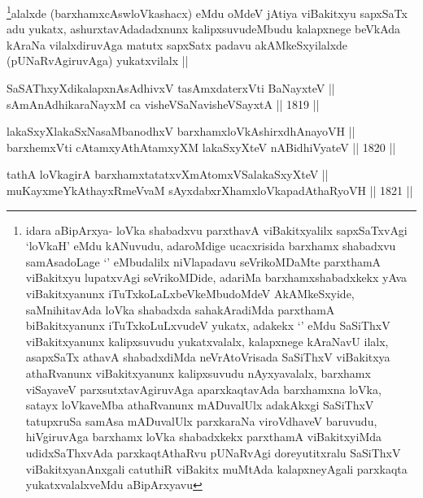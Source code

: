 \begin{artha}
\footnote[1]{idara aBipArxya- loVka shabadxvu parxthavA
viBakitxyalilx sapxSaTxvAgi `loVkaH' eMdu kANuvudu, adaroMdige
ucacxrisida barxhamx shabadxvu samAsadoLage `\stext' eMbudalilx
niVlapadavu seVrikoMDaMte parxthamA viBakitxyu lupatxvAgi
seVrikoMDide, adariMa barxhamxshabadxkekx yAva viBakitxyanunx
iTuTxkoLaLxbeVkeMbudoMdeV AkAMkeSxyide, saMnihitavAda loVka
shabadxda sahakAradiMda parxthamA biBakitxyanunx iTuTxkoLuLxvudeV
yukatx, adakekx `\stext' eMdu SaSiThxV viBakitxyanunx kalipxsuvudu
yukatxvalalx, kalapxnege kAraNavU ilalx, asapxSaTx athavA
shabadxdiMda neVrAtoVrisada SaSiThxV viBakitxya athaRvanunx
viBakitxyanunx kalipxsuvudu nAyxyavalalx, barxhamx viSayaveV
parxsutxtavAgiruvAga aparxkaqtavAda barxhamxna loVka, satayx
loVkaveMba athaRvanunx mADuvalUlx adakAkxgi SaSiThxV tatupxruSa
samAsa mADuvalUlx parxkaraNa viroVdhaveV baruvudu, hiVgiruvAga
barxhamx loVka shabadxkekx parxthamA viBakitxyiMda udidxSaThxvAda
parxkaqtAthaRvu pUNaRvAgi doreyutitxralu SaSiThxV viBakitxyanAnxgali
catuthiR viBakitx muMtAda kalapxneyAgali parxkaqta yukatxvalalxveMdu aBipArxyavu}alalxde (barxhamxcAswloVkashacx) eMdu oMdeV jAtiya
viBakitxyu sapxSaTx adu yukatx, ashurxtavAdadadxnunx kalipxsuvudeMbudu
kalapxnege beVkAda kAraNa vilalxdiruvAga matutx sapxSatx padavu
akAMkeSxyilalxde (pUNaRvAgiruvAga) yukatxvilalx ||
\end{artha}

\begin{shl}
SaSAThxyXdikalapxnA\s sAdhivxV tasAmxdaterxVti BaNayxteV || \\
sAmAnAdhikaraNayxM ca visheVSaNavisheVSayxtA ||  1819 ||  
\end{shl}

\begin{shl}
lakaSxyXlakaSxNasaMbanodhxV barxhamxloVkAshirxdhAnayoVH || \\
barxhemxVti cA\s \s tamxyAthAtamxyXM lakaSxyXteV nABidhiVyateV ||  1820 || 
\end{shl}

\begin{shl}
tathA loVkagirA barxhamxtatatxvXmAtomxVSalakaSxyXteV || \\
muKayxmeYkAthayxRmeVvaM sAyxdabxrXhamxloVkapadAthaRyoVH ||  1821 ||  
\end{shl}

